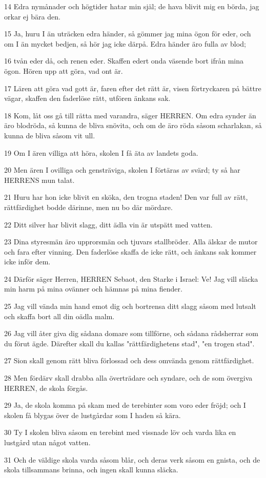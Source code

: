 \par 14 Edra nymånader och högtider hatar min själ; de hava blivit mig en börda, jag orkar ej bära den.
\par 15 Ja, huru I än uträcken edra händer, så gömmer jag mina ögon för eder, och om I än mycket bedjen, så hör jag icke därpå. Edra händer äro fulla av blod;
\par 16 tvån eder då, och renen eder. Skaffen edert onda väsende bort ifrån mina ögon. Hören upp att göra, vad ont är.
\par 17 Lären att göra vad gott är, faren efter det rätt är, visen förtryckaren på bättre vägar, skaffen den faderlöse rätt, utfören änkans sak.
\par 18 Kom, låt oss gå till rätta med varandra, säger HERREN. Om edra synder än äro blodröda, så kunna de bliva snövita, och om de äro röda såsom scharlakan, så kunna de bliva såsom vit ull.
\par 19 Om I ären villiga att höra, skolen I få äta av landets goda.
\par 20 Men ären I ovilliga och gensträviga, skolen I förtäras av svärd; ty så har HERRENS mun talat.
\par 21 Huru har hon icke blivit en sköka, den trogna staden! Den var full av rätt, rättfärdighet bodde därinne, men nu bo där mördare.
\par 22 Ditt silver har blivit slagg, ditt ädla vin är utspätt med vatten.
\par 23 Dina styresmän äro upprorsmän och tjuvars stallbröder. Alla älskar de mutor och fara efter vinning. Den faderlöse skaffa de icke rätt, och änkans sak kommer icke inför dem.
\par 24 Därför säger Herren, HERREN Sebaot, den Starke i Israel: Ve! Jag vill släcka min harm på mina ovänner och hämnas på mina fiender.
\par 25 Jag vill vända min hand emot dig och bortrensa ditt slagg såsom med lutsalt och skaffa bort all din oädla malm.
\par 26 Jag vill åter giva dig sådana domare som tillförne, och sådana rådsherrar som du förut ägde. Därefter skall du kallas "rättfärdighetens stad", "en trogen stad".
\par 27 Sion skall genom rätt bliva förlossad och dess omvända genom rättfärdighet.
\par 28 Men fördärv skall drabba alla överträdare och syndare, och de som övergiva HERREN, de skola förgås.
\par 29 Ja, de skola komma på skam med de terebinter som voro eder fröjd; och I skolen få blygas över de lustgårdar som I haden så kära.
\par 30 Ty I skolen bliva såsom en terebint med vissnade löv och varda lika en lustgård utan något vatten.
\par 31 Och de väldige skola varda såsom blår, och deras verk såsom en gnista, och de skola tillsammans brinna, och ingen skall kunna släcka.


